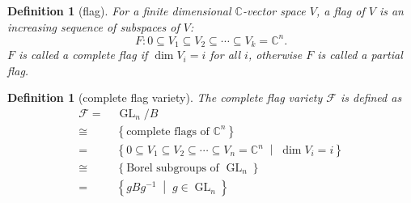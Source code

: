 \documentclass[reqno,11pt]{book}
\numberwithin{equation}{section}
\theoremstyle{plain}
\newtheorem{defn}[theorem]{Definition}
\theoremstyle{plain}
\numberwithin{equation}{section}
\theoremstyle{remark}
\DeclareMathOperator{\GL}{\operatorname{GL}}
\begin{document}
\begin{defn}[flag]
For a finite dimensional $\mathbb{C}$-vector space $V$, a flag of $V$ is an increasing sequence of subspaces of $V$:
$$F: 0 \subseteq V_1 \subseteq V_2 \subseteq \cdots \subseteq V_k = \mathbb{C}^n.$$
$F$ is called a complete flag if $\dim V_i = i$ for all $i$, otherwise $F$ is called a partial flag.
\end{defn}

\begin{defn}[complete flag variety]
The complete flag variety $\mathcal{F}$ is defined as 
\begin{equation*}
\begin{aligned}
  \mathcal{F}=\;& \GL_n/B \\ 
    \cong\;&  \left\{ \text{complete flags of } \mathbb{C}^n \right\} \\ 
      =\;& \left\{ 0 \subseteq V_1 \subseteq V_2 \subseteq \cdots \subseteq V_n = \mathbb{C}^n \;\middle|\; \dim V_i =i \right\} \\ 
       \cong\;&  \left\{ \text{Borel subgroups of } \GL_n \right\} \\
          =\;& \left\{ gBg^{-1} \;\middle|\; g \in \GL_n \right\} \\ 
\end{aligned}
\end{equation*}
\end{defn}
\end{document}
